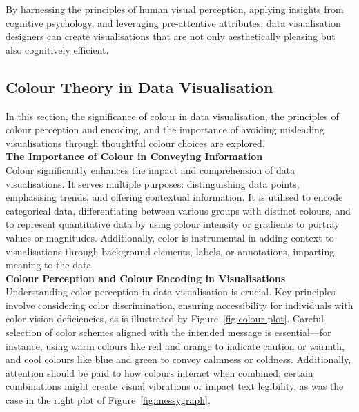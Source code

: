 \documentclass{article}\usepackage[]{graphicx}\usepackage[]{xcolor}
\begin{document}
By harnessing the principles of human visual perception, applying insights from cognitive psychology, and leveraging pre-attentive attributes, data visualisation designers can create visualisations that are not only aesthetically pleasing but also cognitively efficient.	


\subsection{Colour Theory in Data Visualisation}
In this section, the significance of colour in data visualisation, the principles of colour perception and encoding, and the importance of avoiding misleading visualisations through thoughtful colour choices are explored.\\

\noindent \textbf{The Importance of Colour in Conveying Information}\\
Colour significantly enhances the impact and comprehension of data visualisations. It serves multiple purposes: distinguishing data points, emphasising trends, and offering contextual information. It is utilised to encode categorical data, differentiating between various groups with distinct colours, and to represent quantitative data by using colour intensity or gradients to portray values or magnitudes. Additionally, color is instrumental in adding context to visualisations through background elements, labels, or annotations, imparting meaning to the data.\\

\noindent \textbf{Colour Perception and Colour Encoding in Visualisations}\\
Understanding color perception in data visualisation is crucial. Key principles involve considering color discrimination, ensuring accessibility for individuals with color vision deficiencies, as is illustrated by Figure~\ref{fig:colour-plot}. Careful selection of color schemes aligned with the intended message is essential—for instance, using warm colours like red and orange to indicate caution or warmth, and cool colours like blue and green to convey calmness or coldness. Additionally, attention should be paid to how colours interact when combined; certain combinations might create visual vibrations or impact text legibility, as was the case in the right plot of Figure~\ref{fig:messygraph}.\\
\end{document}

